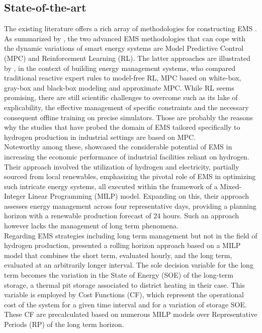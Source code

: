 \subsection{State-of-the-art}
The existing literature offers a rich array of methodologies for constructing EMS \citep{weitzel_energy_2018}. As summarized by \cite{alabi_strategic_2023}, the two advanced EMS methodologies that can cope with the dynamic variations of smart energy systems are Model Predictive Control (MPC) and Reinforcement Learning (RL). The latter approaches are illustrated by \cite{stoffel_evaluation_2023}, in the context of building energy management systems, who compared traditional reactive expert rules to model-free RL, MPC based on white-box, gray-box and black-box modeling and approximate MPC. While RL seems promising, there are still scientific challenges to overcome such as its lake of explicability, the effective management of specific constraints and the necessary consequent offline training on precise simulators. Those are probably the reasons why the studies that have probed the domain of EMS tailored specifically to hydrogen production in industrial settings are based on MPC.
\\
Noteworthy among these, \cite{klyapovskiy_optimal_2021} showcased the considerable potential of EMS in increasing the economic performance of industrial facilities reliant on hydrogen. Their approach involved the utilization of hydrogen and electricity, partially sourced from local renewables, emphasizing the pivotal role of EMS in optimizing such intricate energy systems, all executed within the framework of a Mixed-Integer Linear Programming (MILP) model. Expanding on this, their approach assesses energy management across four representative days, providing a planning horizon with a renewable production forecast of 24 hours. Such an approach however lacks the management of long term phenomena.
\\
Regarding EMS strategies including long term management but not in the field of hydrogen production, \cite{cuisinier_new_2022,cuisinier_impact_2023} presented a rolling horizon approach based on a MILP model that combines the short term, evaluated hourly, and the long term, evaluated at an arbitrarily longer interval.
The sole decision variable for the long term becomes the variation in the State of Energy (SOE) of the long-term storage, a thermal pit storage associated to district heating in their case. This variable is employed by Cost Functions (CF), which represent the operational cost of the system for a given time interval and for a variation of storage SOE. These CF are precalculated based on numerous MILP models over Representative Periods (RP) of the long term horizon.
\\


